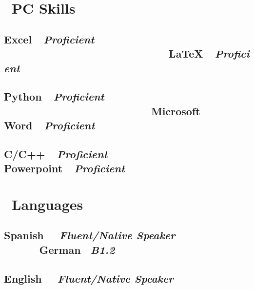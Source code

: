 \documentclass[12pt]{article}
\begin{document}
\section{\faCode \ PC Skills}
	\subsection{\textbf{Excel}\ \ \textit{Proficient} \ \ \ \ \ \ \ \ \ \ \ \ \ \ \ \ \ \ \ \ \ \ \ \ \ \ \ \faAngleDoubleRight \ \textbf{\LaTeX}\ \ \textit{Proficient}}
	\subsection{\textbf{Python}\ \ \textit{Proficient} \ \ \ \ \ \ \ \ \ \ \ \ \ \ \ \ \ \ \ \ \ \ \ \ \faAngleDoubleRight \ \textbf{Microsoft Word}\ \ \textit{Proficient}}
	\subsection{\textbf{C/C++}\ \ \textit{Proficient}\ \ \ \ \ \ \ \ \ \ \ \ \ \ \ \ \ \ \ \ \ \ \ \faAngleDoubleRight \ \textbf{Powerpoint}\ \ \textit{Proficient}}
\section{\faLanguage \ Languages}
	\subsection{\textbf{Spanish} \ \ \textit{Fluent/Native Speaker} \ \ \ \ \ \faAngleDoubleRight \ \textbf{German} \ \textit{B1.2}}
	\subsection{\textbf{English} \ \ \textit{Fluent/Native Speaker}}
\end{document}
